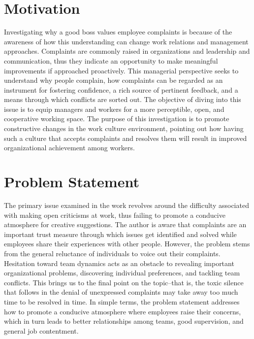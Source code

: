 \documentclass[a4paper,12pt]{report}
\begin{document}
\section{Motivation}
\begin{enumerate}
Investigating why a good boss values employee complaints is because of the awareness of how this understanding can change work relations and management approaches. Complaints are commonly raised in organizations and leadership and communication, thus they indicate an opportunity to make meaningful improvements if approached proactively. This managerial perspective seeks to understand why people complain, how complaints can be regarded as an instrument for fostering confidence, a rich source of pertinent feedback, and a means through which conflicts are sorted out. The objective of diving into this issue is to equip managers and workers for a more perceptible, open, and cooperative working space. The purpose of this investigation is to promote constructive changes in the work culture environment, pointing out how having such a culture that accepts complaints and resolves them will result in improved organizational achievement among workers.    
\end{enumerate}


\section{Problem Statement}
\begin{enumerate}
The primary issue examined in the work revolves around the difficulty associated with making open criticisms at work, thus failing to promote a conducive atmosphere for creative suggestions. The author is aware that complaints are an important trust measure through which issues get identified and solved while employees share their experiences with other people. However, the problem stems from the general reluctance of individuals to voice out their complaints. Hesitation toward team dynamics acts as an obstacle to revealing important organizational problems, discovering individual preferences, and tackling team conflicts. This brings us to the final point on the topic–that is, the toxic silence that follows in the denial of unexpressed complaints may take away too much time to be resolved in time. In simple terms, the problem statement addresses how to promote a conducive atmosphere where employees raise their concerns, which in turn leads to better relationships among teams, good supervision, and general job contentment.
\end{enumerate}
\end{document}
